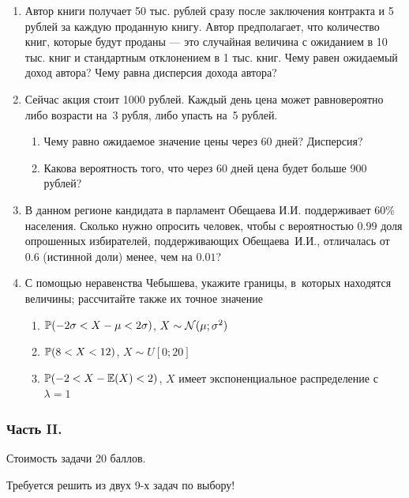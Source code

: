 \begin{enumerate}
\item Автор книги получает 50 тыс. рублей сразу после заключения контракта и 5
рублей за каждую проданную книгу. Автор предполагает, что количество книг, которые
будут проданы — это случайная величина с ожиданием в 10 тыс. книг и стандартным
отклонением в 1 тыс. книг. Чему равен ожидаемый доход автора? Чему равна дисперсия
дохода автора?

\item Сейчас акция стоит 1000 рублей. Каждый день цена может равновероятно либо
возрасти на~3 рубля, либо упасть на~5 рублей.
\begin{enumerate}
\item Чему равно ожидаемое значение цены через 60 дней? Дисперсия?
\item Какова вероятность того, что через 60 дней цена будет больше 900 рублей?
\end{enumerate}


\item В данном регионе кандидата в парламент Обещаева И.И. поддерживает 60\% населения.
Сколько нужно опросить человек, чтобы с вероятностью $0.99$ доля  опрошенных
избирателей, поддерживающих Обещаева~И.И.,  отличалась от $0.6$ (истинной доли)
менее, чем на $0.01$?

\item С помощью неравенства Чебышева, укажите границы, в~которых находятся величины;
рассчитайте также их точное значение
\begin{enumerate}
\item  $\P(-2\sigma<X-\mu<2\sigma)$, $X\sim \cN(\mu;\sigma^{2})$
\item  $\P(8<X<12)$, $X\sim U[0;20]$
\item $\P(-2<X-\E(X)<2)$, $X$ имеет экспоненциальное распределение с $\lambda=1$
\end{enumerate}
\end{enumerate}

\subsubsection*{Часть II.}

Стоимость задачи 20 баллов.

Требуется решить \textbf{} из двух 9-х задач по выбору!

